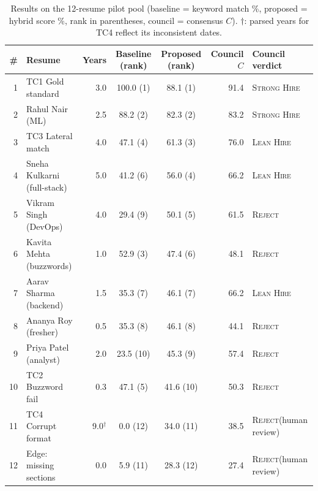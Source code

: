 \documentclass[conference]{IEEEtran}
\newcommand{\verd}[1]{\textsc{#1}}
\newcommand{\Sstrong}{\verd{Strong Hire}}
\newcommand{\Slean}{\verd{Lean Hire}}
\newcommand{\Sreject}{\verd{Reject}}
\begin{document}
\begin{table}[t]
\caption{Results on the 12-resume pilot pool (baseline = keyword match \%, proposed = hybrid score \%, rank in parentheses, council = consensus $C$). $\dagger$: parsed years for TC4 reflect its inconsistent dates.}
\label{tab:pilot}
\centering
\footnotesize
\renewcommand{\arraystretch}{1.1}
\begin{tabular}{@{}rlrccrl@{}}
\toprule
\# & Resume & Years & Baseline (rank) & Proposed (rank) & Council $C$ & Council verdict \\
\midrule
1  & TC1 Gold standard           & 3.0 & 100.0 (1)  & 88.1 (1)  & 91.4 & \Sstrong \\
2  & Rahul Nair (ML)             & 2.5 & 88.2 (2)   & 82.3 (2)  & 83.2 & \Sstrong \\
3  & TC3 Lateral match           & 4.0 & 47.1 (4)   & 61.3 (3)  & 76.0 & \Slean \\
4  & Sneha Kulkarni (full-stack) & 5.0 & 41.2 (6)   & 56.0 (4)  & 66.2 & \Slean \\
5  & Vikram Singh (DevOps)       & 4.0 & 29.4 (9)   & 50.1 (5)  & 61.5 & \Sreject \\
6  & Kavita Mehta (buzzwords)    & 1.0 & 52.9 (3)   & 47.4 (6)  & 48.1 & \Sreject \\
7  & Aarav Sharma (backend)      & 1.5 & 35.3 (7)   & 46.1 (7)  & 66.2 & \Slean \\
8  & Ananya Roy (fresher)        & 0.5 & 35.3 (8)   & 46.1 (8)  & 44.1 & \Sreject \\
9  & Priya Patel (analyst)       & 2.0 & 23.5 (10)  & 45.3 (9)  & 57.4 & \Sreject \\
10 & TC2 Buzzword fail           & 0.3 & 47.1 (5)   & 41.6 (10) & 50.3 & \Sreject \\
11 & TC4 Corrupt format          & 9.0$^\dagger$ & 0.0 (12) & 34.0 (11) & 38.5 & \Sreject (human review) \\
12 & Edge: missing sections      & 0.0 & 5.9 (11)   & 28.3 (12) & 27.4 & \Sreject (human review) \\
\bottomrule
\end{tabular}
\end{table}
\end{document}
